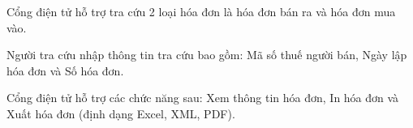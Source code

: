 Cổng điện tử hỗ trợ tra cứu 2 loại hóa đơn là hóa đơn bán ra và hóa đơn mua vào.

Người tra cứu nhập thông tin tra cứu bao gồm: Mã số thuế người bán, Ngày lập hóa đơn và Số hóa đơn.

Cổng điện tử hỗ trợ các chức năng sau: Xem thông tin hóa đơn, In hóa đơn và Xuất hóa đơn (định dạng Excel, XML, PDF).








